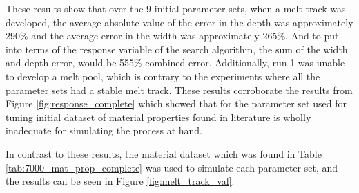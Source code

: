 \documentclass[pdflatex,sn-mathphys]{sn-jnl}
\begin{document}
	These results show that over the 9 initial parameter sets, when a melt track was developed, the average absolute value of the error in the depth was approximately 290\% and the average error in the width was approximately 265\%.  And to put into terms of the response variable of the search algorithm, the sum of the width and depth error, would be 555\% combined error.
	Additionally, run 1 was unable to develop a melt pool, which is contrary to the experiments where all the parameter sets had a stable melt track.  These results corroborate the results from Figure \ref{fig:response_complete} which showed that for the parameter set used for tuning initial dataset of material properties found in literature is wholly inadequate for simulating the process at hand. 

	In contrast to these results, the material dataset which was found in Table \ref{tab:7000_mat_prop_complete} was used to simulate each parameter set, and the results can be seen in Figure \ref{fig:melt_track_val}.
\end{document}
